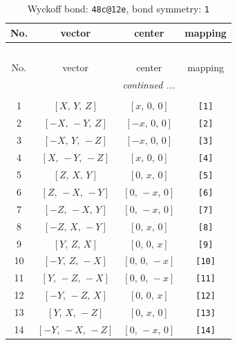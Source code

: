 \documentclass[fleqn,8pt]{jsarticle}
\begin{document}
\begin{longtable}{cccc}
\caption{Wyckoff bond: {\tt 48c@12e}, bond symmetry: {\tt 1}}
 \\
 \hline \hline
No. & vector & center & mapping \\ \hline \endfirsthead

\multicolumn{3}{l}{\tablename\ \thetable{}} \\
 \hline \hline
No. & vector & center & mapping \\ \hline \endhead

 \hline \hline
\multicolumn{3}{r}{\footnotesize\it continued ...} \\ \endfoot

 \hline \hline
\multicolumn{3}{r}{} \\ \endlastfoot

1 & $\left[ X,\, Y,\, Z \right]$ & $\left[ x,\, 0,\, 0 \right]$ & {\tt [1]} \\ \hline
2 & $\left[ - X,\, - Y,\, Z \right]$ & $\left[ - x,\, 0,\, 0 \right]$ & {\tt [2]} \\ \hline
3 & $\left[ - X,\, Y,\, - Z \right]$ & $\left[ - x,\, 0,\, 0 \right]$ & {\tt [3]} \\ \hline
4 & $\left[ X,\, - Y,\, - Z \right]$ & $\left[ x,\, 0,\, 0 \right]$ & {\tt [4]} \\ \hline
5 & $\left[ Z,\, X,\, Y \right]$ & $\left[ 0,\, x,\, 0 \right]$ & {\tt [5]} \\ \hline
6 & $\left[ Z,\, - X,\, - Y \right]$ & $\left[ 0,\, - x,\, 0 \right]$ & {\tt [6]} \\ \hline
7 & $\left[ - Z,\, - X,\, Y \right]$ & $\left[ 0,\, - x,\, 0 \right]$ & {\tt [7]} \\ \hline
8 & $\left[ - Z,\, X,\, - Y \right]$ & $\left[ 0,\, x,\, 0 \right]$ & {\tt [8]} \\ \hline
9 & $\left[ Y,\, Z,\, X \right]$ & $\left[ 0,\, 0,\, x \right]$ & {\tt [9]} \\ \hline
10 & $\left[ - Y,\, Z,\, - X \right]$ & $\left[ 0,\, 0,\, - x \right]$ & {\tt [10]} \\ \hline
11 & $\left[ Y,\, - Z,\, - X \right]$ & $\left[ 0,\, 0,\, - x \right]$ & {\tt [11]} \\ \hline
12 & $\left[ - Y,\, - Z,\, X \right]$ & $\left[ 0,\, 0,\, x \right]$ & {\tt [12]} \\ \hline
13 & $\left[ Y,\, X,\, - Z \right]$ & $\left[ 0,\, x,\, 0 \right]$ & {\tt [13]} \\ \hline
14 & $\left[ - Y,\, - X,\, - Z \right]$ & $\left[ 0,\, - x,\, 0 \right]$ & {\tt [14]} \\ \hline

\end{longtable}
\end{document}
